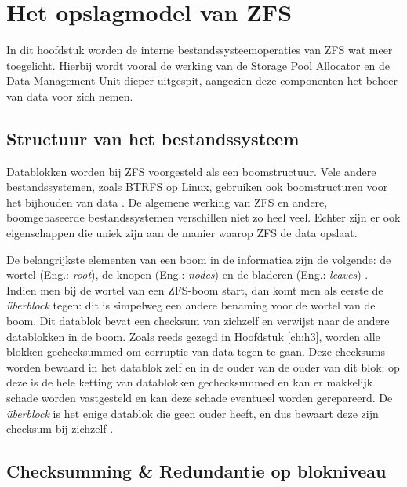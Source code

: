 

\chapter{Het opslagmodel van ZFS}
\label{ch:h4}

In dit hoofdstuk worden de interne bestandssysteemoperaties van ZFS wat meer toegelicht. Hierbij wordt vooral de werking van de Storage Pool Allocator en de Data Management Unit dieper uitgespit, aangezien deze componenten het beheer van data voor zich nemen.

\section{Structuur van het bestandssysteem}

Datablokken worden bij ZFS voorgesteld als een boomstructuur. Vele andere bestandssystemen, zoals BTRFS op Linux, gebruiken ook boomstructuren voor het bijhouden van data \autocite{Project2017a}. De algemene werking van ZFS en andere, boomgebaseerde bestandssystemen verschillen niet zo heel veel. Echter zijn er ook eigenschappen die uniek zijn aan de manier waarop ZFS de data opslaat.

De belangrijkste elementen van een boom in de informatica zijn de volgende: de wortel (Eng.: \textit{root}), de knopen (Eng.: \textit{nodes}) en de bladeren (Eng.: \textit{leaves}) \autocite{Cohen}. Indien men bij de wortel van een ZFS-boom start, dan komt men als eerste de \textit{\"{u}berblock} tegen: dit is simpelweg een andere benaming voor de wortel van de boom. Dit datablok bevat een checksum van zichzelf en verwijst naar de andere datablokken in de boom. Zoals reeds gezegd in Hoofdstuk \ref{ch:h3}, worden alle blokken gechecksummed om corruptie van data tegen te gaan. Deze checksums worden bewaard in het datablok zelf en in de ouder van de ouder van dit blok: op deze is de hele ketting van datablokken gechecksummed en kan er makkelijk schade worden vastgesteld en kan deze schade eventueel worden gerepareerd. De \textit{\"{u}berblock} is het enige datablok die geen ouder heeft, en dus bewaart deze zijn checksum bij zichzelf \autocite{ZFSBonwick}.  

\section{Checksumming \& Redundantie op blokniveau}


